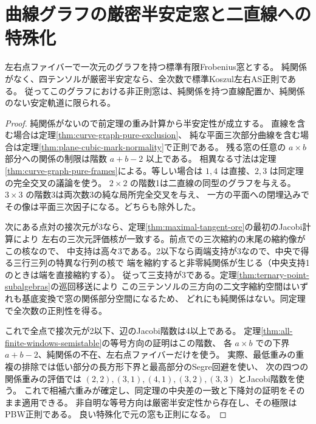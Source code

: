 \section{曲線グラフの厳密半安定窓と二直線への特殊化}
\label{sec:curve-graded-limits}
\begin{theorem}\label{thm:curve-strictly-semistable}
左右点ファイバーで一次元のグラフを持つ標準有限Frobenius窓とする。
純関係がなく、四テンソルが厳密半安定なら、全次数で標準Koszul左右AS正則である。
従ってこのグラフにおける非正則窓は、純関係を持つ直線配置か、純関係のない安定軌道に限られる。
\end{theorem}
\begin{proof}
純関係がないので前定理の重み計算から半安定性が成立する。
直線を含む場合は定理\ref{thm:curve-graph-pure-exclusion}、
純な平面三次部分曲線を含む場合は定理\ref{thm:plane-cubic-mark-normality}で正則である。
残る窓の任意の $a\times b$ 部分への関係の制限は階数 $a+b-2$ 以上である。
相異なる寸法は定理\ref{thm:curve-graph-pure-frames}による。等しい場合は
$1,4$ は直接、$2,3$ は同定理の完全交叉の議論を使う。
$2\times2$ の階数1は二直線の同型のグラフを与える。
$3\times3$ の階数3は両次数3の純な局所完全交叉を与え、
一方の平面への閉埋込みでその像は平面三次因子になる。どちらも除外した。

次にある点対の接次元が3なら、定理\ref{thm:maximal-tangent-ore}の最初のJacobi計算により
左右の三次元評価核が一致する。前点での三次縮約の末尾の縮約像がこの核なので、
中支持は高々3である。2以下なら両端支持が3なので、中央で得る三行三列の特異な行列の核で
端を縮約すると非零純関係が生じる（中央支持1のときは端を直接縮約する）。
従って三支持が3である。定理\ref{thm:ternary-point-subalgebras}の巡回移送により
この三テンソルの三方向の二文字縮約空間はいずれも基底変換で窓の関係部分空間になるため、
どれにも純関係はない。同定理で全次数の正則性を得る。

これで全点で接次元が2以下、辺のJacobi階数は4以上である。
定理\ref{thm:all-finite-windows-semistable}の等号方向の証明はこの階数、
各 $a\times b$ での下界 $a+b-2$、純関係の不在、左右点ファイバーだけを使う。
実際、最低重みの重複の排除では低い部分の長方形下界と最高部分のSegre回避を使い、
次の四つの関係重みの評価では $(2,2),(3,1),(4,1),(3,2),(3,3)$ とJacobi階数を使う。
これで相補六重みが確定し、同定理の中央差の一致と下降対の証明をそのまま適用できる。
非自明な等号方向は厳密半安定性から存在し、その極限はPBW正則である。
良い特殊化で元の窓も正則になる。
\end{proof}

